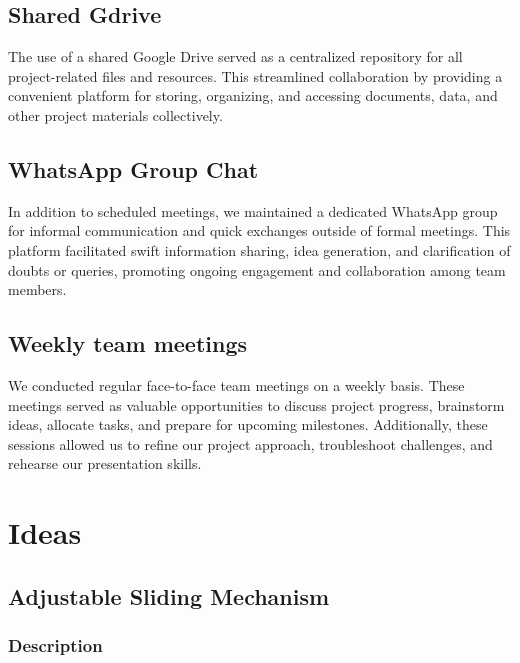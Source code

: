 \documentclass[a4paper,10pt]{article}
\begin{document}
\subsection{Shared Gdrive}
The use of a shared Google Drive served as a centralized repository for all project-related files and resources. This streamlined collaboration by providing a convenient platform for storing, organizing, and accessing documents, data, and other project materials collectively.

\subsection{WhatsApp Group Chat}
 In addition to scheduled meetings, we maintained a dedicated WhatsApp group for informal communication and quick exchanges outside of formal meetings. This platform facilitated swift information sharing, idea generation, and clarification of doubts or queries, promoting ongoing engagement and collaboration among team members.

\subsection{Weekly team meetings}
We conducted regular face-to-face team meetings on a weekly basis. These meetings served as valuable opportunities to discuss project progress, brainstorm ideas, allocate tasks, and prepare for upcoming milestones. Additionally, these sessions allowed us to refine our project approach, troubleshoot challenges, and rehearse our presentation skills.




\section{Ideas}

\subsection{Adjustable Sliding Mechanism}

\subsubsection{Description}
\end{document}
